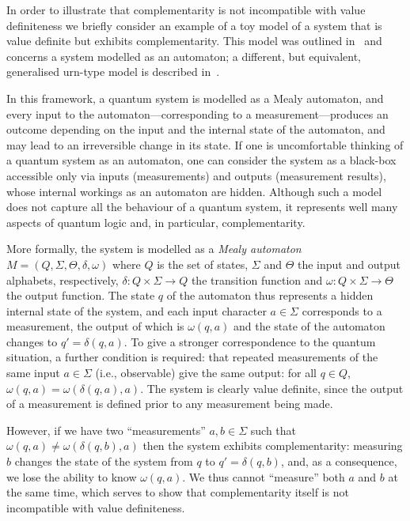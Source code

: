 \documentclass[information,article,submit,moreauthors,pdftex,12pt,a4paper]{mdpi}
\theoremstyle{mdpi}
\newcounter{ex}
\newcounter{re}
\theoremstyle{mdpidefinition}
\begin{document}
In order to illustrate that complementarity is not incompatible with value definiteness we briefly consider an example of a toy model of a system that is value definite but exhibits complementarity.
This model was outlined in~\cite{svozil-2001-eua} and concerns a system modelled as an automaton; a different, but equivalent, generalised urn-type model is described in~\cite{wright}.

In this framework, a quantum system is modelled as a Mealy automaton, and every input to the automaton---corresponding to a measurement---produces an outcome depending on the input and the internal state of the automaton, and may lead to an irreversible change in its state.
If one is uncomfortable thinking of a quantum system as an automaton, one can consider the system as a black-box accessible only via inputs (measurements) and outputs (measurement results), whose internal workings as an automaton are hidden.
Although such a model does not capture all the behaviour of a quantum system, it represents well many aspects of quantum logic and, in particular, complementarity.

More formally, the system is modelled as a \emph{Mealy automaton} $M=(Q,\Sigma,\Theta,\delta,\omega)$ where $Q$ is the set of states, $\Sigma$ and $\Theta$ the input and output alphabets, respectively, $\delta : Q\times \Sigma \to Q$ the transition function and $\omega: Q \times \Sigma \to \Theta$ the output function.
The state $q$ of the automaton thus represents a hidden internal state of the system, and each input character $a\in \Sigma$ corresponds to a measurement, the output of which is $\omega(q,a)$ and the state of the automaton changes to $q'=\delta(q,a)$.
To give a stronger correspondence to the quantum situation, a further condition is required: that repeated measurements of the same input $a\in \Sigma$ (i.e., observable) give the same output:
for all $q\in Q$, $\omega(q,a)=\omega(\delta(q,a),a)$.
The system is clearly value definite, since the output of a measurement is defined prior to any measurement being made.

However, if we have two ``measurements'' $a,b\in \Sigma$ such that $\omega(q,a)\neq \omega(\delta(q,b),a)$ then the system exhibits complementarity:
measuring $b$ changes the state of the system from $q$ to $q'=\delta(q,b)$, and, as a consequence, we lose the ability to know $\omega(q,a)$.
We thus cannot ``measure'' both $a$ and $b$ at the same time, which serves to show that complementarity itself is not incompatible with value definiteness.
\end{document}
